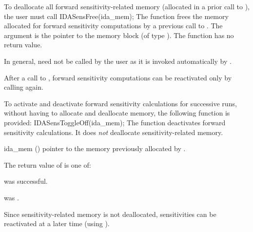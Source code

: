 To deallocate all forward sensitivity-related memory (allocated in a prior call
to ), the user must call
{
  IDASensFree(ida\_mem);
}
{
  The function  frees the memory allocated for forward sensitivity 
  computations by a previous call to .
}
{
  The argument is the pointer to the {\idas} memory block (of type ).
}
{
  The function  has no return value.
}
{
  In general,  need not be called by the user as it is
  invoked automatically by .

  After a call to , forward sensitivity computations can be reactivated
  only by calling  again.
}
To activate and deactivate forward sensitivity calculations for successive {\idas} runs,
without having to allocate and deallocate memory, the following function is provided:
{
  IDASensToggleOff(ida\_mem);
}
{
  The function  deactivates forward sensitivity 
  calculations. It does {\em not} deallocate sensitivity-related memory.
}
{
  \begin{args}
  \item[ida\_mem] ()
    pointer to the memory previously allocated by .
  \end{args}
}
{
  The return value  of  is one of:
  \begin{args}
  \item[\Id{IDA\_SUCCESS}] 
     was successful.
  \item[\Id{IDA\_MEM\_NULL}] 
     was .
  \end{args}
}
{
  Since sensitivity-related memory is not deallocated, sensitivities can
  be reactivated at a later time (using ).
}

